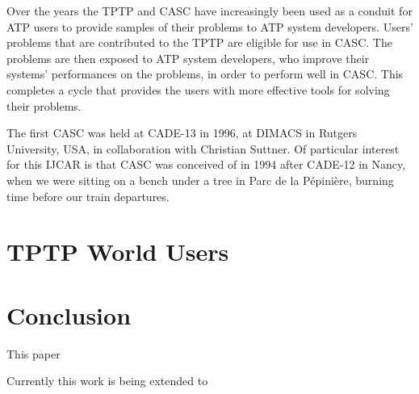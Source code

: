 \documentclass{easychair}
\begin{document}
Over the years the TPTP and CASC have increasingly been used as a conduit for ATP users to provide 
samples of their problems to ATP system developers.
Users' problems that are contributed to the TPTP are eligible for use in CASC.
The problems are then exposed to ATP system developers, who improve their systems' performances 
on the problems, in order to perform well in CASC.
This completes a cycle that provides the users with more effective tools for solving their 
problems.

The first CASC was held at CADE-13 in 1996, at DIMACS in Rutgers University, USA, in collaboration
with Christian Suttner.
Of particular interest for this IJCAR is that CASC was conceived of in 1994 after CADE-12 in
Nancy, when we were sitting on a bench under a tree in Parc de la Pépinière, burning time before
our train departures.

\section{TPTP World Users}
\label{Users}

\section{Conclusion}
\label{Conclusion}

This paper 

Currently this work is being extended to 



\end{document}
